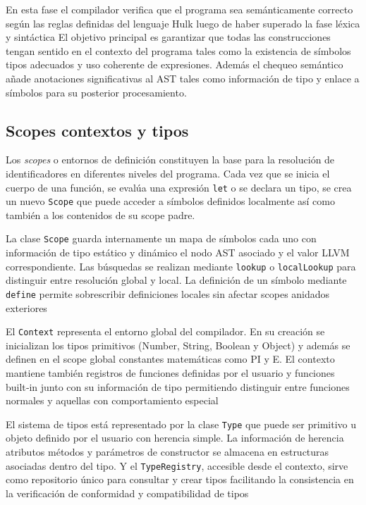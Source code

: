 \documentclass{llncs}
\begin{document}
	En esta fase el compilador verifica que el programa sea semánticamente correcto según las reglas definidas del lenguaje Hulk luego de haber superado la fase léxica y sintáctica El objetivo principal es garantizar que todas las construcciones tengan sentido en el contexto del programa tales como la existencia de símbolos tipos adecuados y uso coherente de expresiones. Además el chequeo semántico añade anotaciones significativas al AST tales como información de tipo y enlace a símbolos para su posterior procesamiento.
	
	\subsection{Scopes contextos y tipos}
	
	Los \textit{scopes} o entornos de definición constituyen la base para la resolución de identificadores en diferentes niveles del programa. Cada vez que se inicia el cuerpo de una función, se evalúa una expresión \texttt{let} o se declara un tipo, se crea un nuevo \texttt{Scope} que puede acceder a símbolos definidos localmente así como también a los contenidos de su scope padre.
	
	La clase \texttt{Scope} guarda internamente un mapa de símbolos cada uno con información de tipo estático y dinámico el nodo AST asociado y el valor LLVM correspondiente. Las búsquedas se realizan mediante \texttt{lookup} o \texttt{localLookup} para distinguir entre resolución global y local. La definición de un símbolo mediante \texttt{define} permite sobrescribir definiciones locales sin afectar scopes anidados exteriores
	
	El \texttt{Context} representa el entorno global del compilador. En su creación se inicializan los tipos primitivos (Number, String, Boolean y Object) y además se definen en el scope global constantes matemáticas como PI y E. El contexto mantiene también registros de funciones definidas por el usuario y funciones built‑in junto con su información de tipo permitiendo distinguir entre funciones normales y aquellas con comportamiento especial
	
	El sistema de tipos está representado por la clase \texttt{Type} que puede ser primitivo u objeto definido por el usuario con herencia simple. La información de herencia atributos métodos y parámetros de constructor se almacena en estructuras asociadas dentro del tipo. Y el \texttt{TypeRegistry}, accesible desde el contexto, sirve como repositorio único para consultar y crear tipos facilitando la consistencia en la verificación de conformidad y compatibilidad de tipos
	
\end{document}
